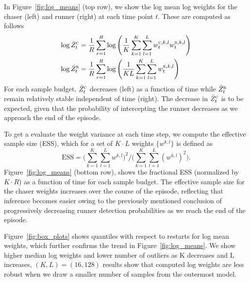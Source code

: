 \documentclass[twoside]{article}
\begin{document}
In Figure~\ref{fig:log_means} (top row), we show the log mean log weights for the chaser (left) and runner (right) at each time point $t$. These  are computed as follows 
\begin{align*}
    \log
    \bar{Z}^\textsc{c}_t 
    &=\frac{1}{R}
    \sum_{r=1}^R 
    \log 
    \left(
    \frac{1}{K}
    \sum_{k=1}^K
    \sum_{l=1}^L
    w^{\textsc{c},k,l}_t
    w^{\textsc{r},k,l}_t
    \right)
    \\
    \log
    \bar{Z}^\textsc{r}_t 
    &=\frac{1}{R}
    \sum_{r=1}^R 
    \log 
    \left(
    \frac{1}{KL}
    \sum_{k=1}^K
    \sum_{l=1}^L
    w^{\textsc{r},k,l}_t
    \right)
\end{align*}
For each sample budget, $\bar{Z}^\textsc{c}_t$ decreases (left) as a function of time while $\bar{Z}^\textsc{r}_t$ remain relatively stable independent of time (right). The decrease in $\bar{Z}^\textsc{c}_t$ is to be expected, given that the probability of intercepting the runner decreases as we approach the end of the episode.

To get a evaluate the weight variance at each time step, we compute the effective sample size (ESS), which for a set of $K \cdot L$ weights $\{w^{k,l}\}$ is defined as 
\vskip -0.1in
\[
    \textstyle \text{ESS} 
    = 
    \Big(
        \sum_{k=1}^K \sum_{l=1}^L w^{k,l} 
    \Big)^2 
    / 
    \Big( 
        \sum_{k=1}^K \sum_{l=1}^L (w^{k,l})^2
    \Big).
\]
Figure~\ref{fig:log_means} (bottom row), shows the fractional ESS %
(normalized by $K \cdot R$) %
as a function of time for each sample budget. The effective sample size for the chaser weights increases over the course of the episode, reflecting that inference becomes easier owing to the previously mentioned conclusion of progressively decreasing runner detection probabilities as we reach the end of the episode.

Figure~\ref{fig:box_plots} shows quantiles with respect to restarts for log mean weights, which further confirms the trend in Figure~\ref{fig:log_means}. We show higher median log weights and lower number of outliers as K decreases and L increases,  $(K,L)=(16,128)$ results show that computed log weights are less robust when we draw a smaller number of samples from the outermost model. 
\end{document}
